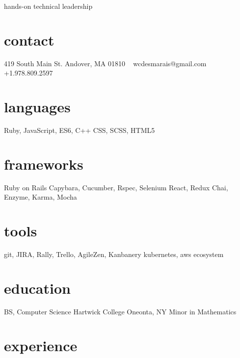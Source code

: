 \documentclass[]{friggeri-cv}
\begin{document}
       {hands-on technical leadership}
       
\begin{aside}
  \section{contact}
    419 South Main St.
    Andover, MA 01810
    ~
    wcdesmarais@gmail.com
    ~
    +1.978.809.2597
  \section{languages}
    Ruby, JavaScript, 
    ES6, C++
    CSS, SCSS, HTML5
  \section{frameworks}
    Ruby on Rails
    Capybara, Cucumber, Rspec, Selenium
    React, Redux
    Chai, Enzyme, Karma, Mocha
  \section{tools}
    git, JIRA, Rally, Trello,
    AgileZen, Kanbanery
    kubernetes,
    aws ecosystem
  \section{education}
    BS, Computer Science
    Hartwick College
    Oneonta, NY
    Minor in Mathematics
\end{aside}

\section{experience}
\end{document}

